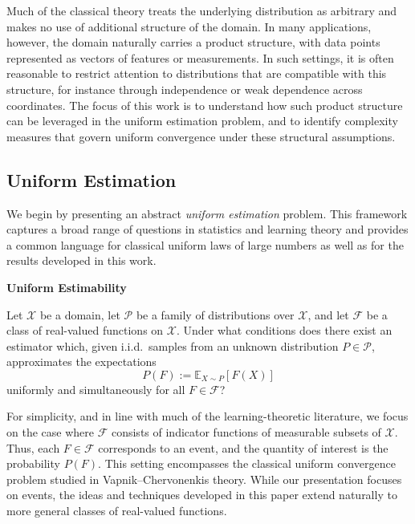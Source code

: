 \documentclass[arxiv]{colt2026}
\newcommand{\X}{\mathcal{X}}
\newcommand{\F}{\mathcal{F}}
\newcommand{\Pc}{\mathcal{P}}
\begin{document}
Much of the classical theory treats the underlying distribution as arbitrary and makes no use of additional structure of the domain. In many applications, however, the domain naturally carries a product structure, with data points represented as vectors of features or measurements. In such settings, it is often reasonable to restrict attention to distributions that are compatible with this structure, for instance through independence or weak dependence across coordinates. The focus of this work is to understand how such product structure can be leveraged in the uniform estimation problem, and to identify complexity measures that govern uniform convergence under these structural assumptions.


\subsection{Uniform Estimation}

{We begin by presenting an abstract \emph{uniform estimation} problem.} 
This framework captures a broad range of questions in statistics and learning theory and provides a common language for classical uniform laws of large numbers as well as for the results developed in this work.

\begin{mdframed}[
  backgroundcolor=gray!5,
  linecolor=gray!40,
  linewidth=0.5pt,
  roundcorner=6pt,
  innertopmargin=0.8em,
  innerbottommargin=0.8em
]
\begin{center}
\textbf{Uniform Estimability}
\end{center}
\medskip
\noindent
Let $\X$ be a domain, let $\Pc$ be a family of distributions over $\X$, and let $\F$ be a class of real-valued functions on $\X$.
Under what conditions does there exist an estimator which, given i.i.d.\ samples from an unknown distribution $P \in \Pc$, approximates the expectations
\[
P(F) := \mathbb{E}_{X \sim P}[F(X)]
\]
uniformly and simultaneously for all $F \in \F$?
\end{mdframed}

For simplicity, and in line with much of the learning-theoretic literature, we focus on the case where $\F$ consists of indicator functions of measurable subsets of $\X$. Thus, each $F \in \F$ corresponds to an event, and the quantity of interest is the probability $P(F)$. This setting encompasses the classical uniform convergence problem studied in Vapnik--Chervonenkis theory. While our presentation focuses on events, the ideas and techniques developed in this paper extend naturally to more general classes of real-valued functions.
\end{document}
